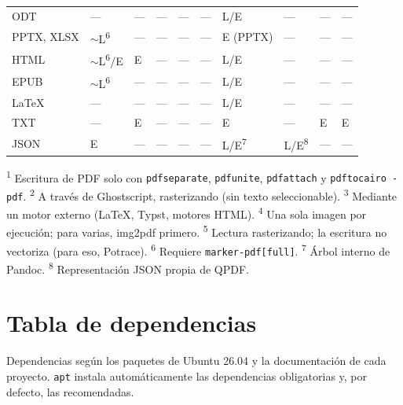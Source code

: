 \documentclass[11pt,a4paper]{article}
\newcommand{\cmd}[1]{\texttt{\textcolor{colcmd}{#1}}}      %
\newcommand{\condic}{\textcolor{coladvert}{$\boldsymbol{\sim}$}}
\begin{document}
\begin{longtable}{L{2.15cm}C{1.15cm}C{1.22cm}C{1.27cm}C{2.04cm}C{1.19cm}C{1.15cm}C{1.01cm}C{1.98cm}C{1.8cm}}
		ODT & --- & --- & --- & --- & --- & L/E & --- & --- & ---\\
		PPTX, XLSX & \condic L\textsuperscript{6} & --- & --- & --- & --- & E (PPTX) & --- & --- & ---\\
		HTML & \condic L\textsuperscript{6}/E & E & --- & --- & --- & L/E & --- & --- & ---\\
		EPUB & \condic L\textsuperscript{6} & --- & --- & --- & --- & L/E & --- & --- & ---\\
		LaTeX & --- & --- & --- & --- & --- & L/E & --- & --- & ---\\
		TXT & --- & E & --- & --- & --- & E & --- & E & E\\*
		JSON & E & --- & --- & --- & --- & L/E\textsuperscript{7} & L/E\textsuperscript{8} & --- & ---\\
	\end{longtable}
	\endgroup
	
	{\footnotesize
		\textsuperscript{1} Escritura de PDF solo con \cmd{pdfseparate}, \cmd{pdfunite}, \cmd{pdfattach} y \cmd{pdftocairo -pdf}.
		\textsuperscript{2} A través de Ghostscript, rasterizando (sin texto seleccionable).
		\textsuperscript{3} Mediante un motor externo (LaTeX, Typst, motores HTML).
		\textsuperscript{4} Una sola imagen por ejecución; para varias, img2pdf primero.
		\textsuperscript{5} Lectura rasterizando; la escritura no vectoriza (para eso, Potrace).
		\textsuperscript{6} Requiere \texttt{marker-\allowbreak{}pdf[full]}.
		\textsuperscript{7} Árbol interno de Pandoc.
		\textsuperscript{8} Representación JSON propia de QPDF.\par}
	
	\clearpage
	\section{Tabla de dependencias}\label{sec:dependencias}
	
	Dependencias según los paquetes de Ubuntu 26.04 y la documentación de cada proyecto. \cmd{apt} instala automáticamente las dependencias obligatorias y, por defecto, las recomendadas.
	
\end{document}
